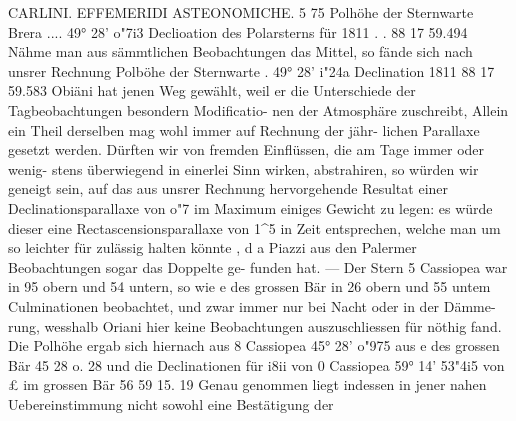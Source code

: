 \documentclass[12pt,a4paper]{article}
\begin{document}
\newpage
CARLINI. EFFEMERIDI ASTEONOMICHE. 5 75\newline
Polhöhe der Sternwarte Brera .... 49° 28' o"7i3\newline
Declioation des Polarsterns für 1811 . . 88 17 59.494\newline
Nähme man aus sämmtlichen Beobachtungen das Mittel, so fände sich nach unsrer Rechnung\newline
Polböhe der Sternwarte . 49° 28' i"24a\newline
Declination 1811 88 17 59.583\newline
Obiäni hat jenen Weg gewählt, weil er die Unterschiede der Tagbeobachtungen besondern Modificatio-\newline
nen der Atmosphäre zuschreibt, Allein ein Theil derselben mag wohl immer auf Rechnung der jähr-\newline
lichen Parallaxe gesetzt werden. Dürften wir von fremden Einflüssen, die am Tage immer oder wenig-\newline
stens überwiegend in einerlei Sinn wirken, abstrahiren, so würden wir geneigt sein, auf das aus unsrer\newline
Rechnung hervorgehende Resultat einer Declinationsparallaxe von o"7 im Maximum einiges Gewicht zu\newline
legen: es würde dieser eine Rectascensionsparallaxe von 1\^{}5 in Zeit entsprechen, welche man um so\newline
leichter für zulässig halten könnte , d a Piazzi aus den Palermer Beobachtungen sogar das Doppelte ge-\newline
funden hat. --- Der Stern 5 Cassiopea war in 95 obern und 54 untern, so wie e des grossen Bär in 26\newline
obern und 55 untem Culminationen beobachtet, und zwar immer nur bei Nacht oder in der Dämme-\newline
rung, wesshalb Oriani hier keine Beobachtungen auszuschliessen für nöthig fand. Die Polhöhe ergab\newline
sich hiernach\newline
aus 8 Cassiopea 45° 28' o"975\newline
aus e des grossen Bär 45 28 o. 28\newline
und die Declinationen für i8ii\newline
von 0 Cassiopea 59° 14' 53"4i5\newline
von £ im grossen Bär 56 59 15. 19\newline
Genau genommen liegt indessen in jener nahen Uebereinstimmung nicht sowohl eine Bestätigung der\newline
\end{document}

